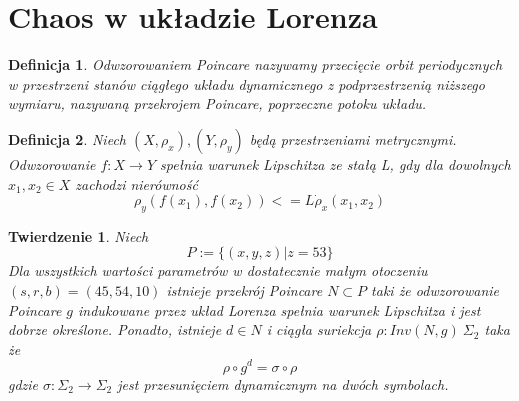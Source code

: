 \documentclass[12pt]{report}
\newtheorem{theorem}{Twierdzenie}
\newtheorem{definition}{Definicja}
\begin{document}
	\section{Chaos w układzie Lorenza}
	\begin{definition}
		Odwzorowaniem Poincare nazywamy przecięcie orbit periodycznych w przestrzeni stanów ciągłego układu dynamicznego z podprzestrzenią niższego wymiaru, nazywaną przekrojem Poincare, poprzeczne potoku układu.
	\end{definition}
	\begin{definition}
		Niech $(X, \rho _x), (Y, \rho _y)$ będą przestrzeniami metrycznymi. Odwzorowanie $f: X \to Y$ spełnia warunek Lipschitza ze stałą L, gdy dla dowolnych $x_1, x_2 \in X$ zachodzi nierówność
			\[ \rho _y (f(x_1), f(x_2)) <= L \dot \rho _x (x_1, x_2) \]
	\end{definition}
	\begin{theorem}
		Niech
			\[ P := \{(x, y, z) | z = 53\} \]
		Dla wszystkich wartości parametrów w dostatecznie małym otoczeniu $(s, r, b) = (45, 54, 10)$ istnieje przekrój Poincare $N \subset P$ taki że odwzorowanie Poincare $g$ indukowane przez układ Lorenza spełnia warunek Lipschitza i jest dobrze określone. Ponadto, istnieje $d \in N$ i ciągła suriekcja $\rho : Inv(N, g) \ \Sigma _2$ taka że
			\[ \rho \circ g^d = \sigma \circ \rho \]
		gdzie $\sigma : \Sigma _2 \to \Sigma _2$ jest przesunięciem dynamicznym na dwóch symbolach. \cite{MM}
	\end{theorem}
\end{document}
